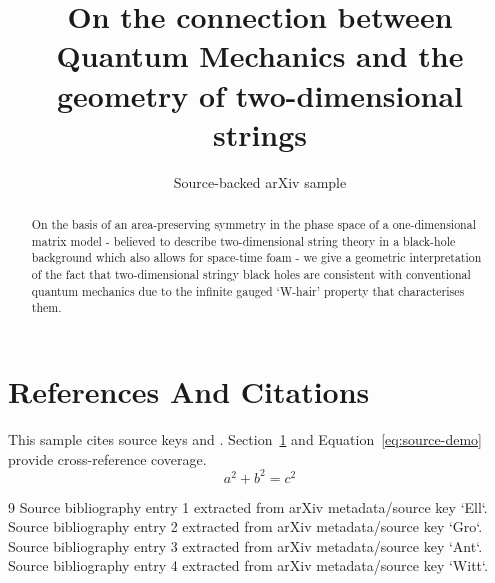 \documentclass[11pt]{article}
\title{On the connection between Quantum Mechanics and the geometry of
  two-dimensional strings}
\author{Source-backed arXiv sample}
\date{}
\begin{document}
\maketitle
\begin{abstract}
On the basis of an area-preserving symmetry in the phase space of a one-dimensional matrix model - believed to describe two-dimensional string theory in a black-hole background which also allows for space-time foam - we give a geometric interpretation of the fact that two-dimensional stringy black holes are consistent with conventional quantum mechanics due to the infinite gauged `W-hair' property that characterises them.
\end{abstract}
\section{References And Citations}
\label{sec:refs}
This sample cites source keys \cite{Ell} and \cite{Gro}. Section~\ref{sec:refs} and Equation~\ref{eq:source-demo} provide cross-reference coverage.
\begin{equation}
\label{eq:source-demo}
a^2 + b^2 = c^2
\end{equation}
\begin{thebibliography}{9}
 Source bibliography entry 1 extracted from arXiv metadata/source key `Ell`.
 Source bibliography entry 2 extracted from arXiv metadata/source key `Gro`.
 Source bibliography entry 3 extracted from arXiv metadata/source key `Ant`.
 Source bibliography entry 4 extracted from arXiv metadata/source key `Witt`.
\end{thebibliography}
\end{document}

